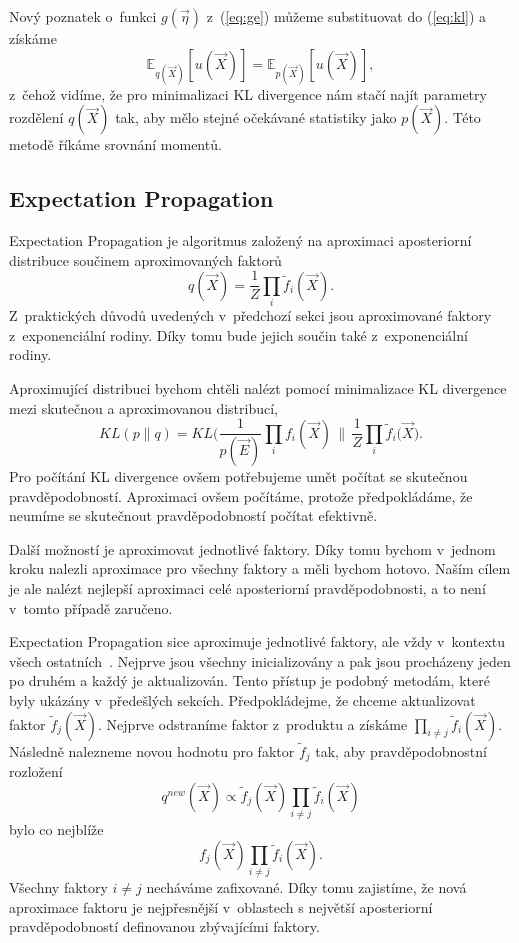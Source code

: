 Nový poznatek o~funkci $g(\vec\eta)$ z~(\ref{eq:ge}) můžeme substituovat do (\ref{eq:kl}) a získáme
\begin{equation}
\mathbb{E}_{q(\vec{X})}[u(\vec{X})] = \mathbb{E}_{p(\vec{X})}[u(\vec{X})],
\label{eq:ee}
\end{equation}
z~čehož vidíme, že pro minimalizaci KL divergence nám stačí najít parametry rozdělení $q(\vec{X})$ tak, aby mělo stejné očekávané statistiky jako $p(\vec{X})$. 
Této metodě říkáme srovnání momentů.

\subsection{Expectation Propagation}
\label{sec:ep}

Expectation Propagation je algoritmus založený na aproximaci aposteriorní distribuce součinem aproximovaných faktorů
\begin{equation}
q(\vec{X}) = \frac{1}{Z} \prod_i \tilde{f}_i(\vec{X}).
\end{equation}
Z~praktických důvodů uvedených v~předchozí sekci jsou aproximované faktory z~exponenciální rodiny.
Díky tomu bude jejich součin také z~exponenciální rodiny.

Aproximující distribuci bychom chtěli nalézt pomocí minimalizace KL divergence mezi skutečnou a aproximovanou distribucí,
\begin{equation}
KL(p \| q) = KL\bigg(\frac{1}{p(\vec{E})} \prod_i f_i(\vec{X}) \, \bigg\| \, \frac{1}{Z} \prod_i \tilde{f}_i(\vec{X} \bigg).
\end{equation}
Pro počítání KL divergence ovšem potřebujeme umět počítat se skutečnou pravděpodobností.
Aproximaci ovšem počítáme, protože předpokládáme, že neumíme se skutečnout pravděpodobností počítat efektivně.

Další možností je aproximovat jednotlivé faktory.
Díky tomu bychom v~jednom kroku nalezli aproximace pro všechny faktory a měli bychom hotovo.
Naším cílem je ale nalézt nejlepší aproximaci celé aposteriorní pravděpodobnosti, a to není v~tomto případě zaručeno.

Expectation Propagation sice aproximuje jednotlivé faktory, ale vždy v~kontextu všech ostatních~\cite{bishop2006pattern}.
Nejprve jsou všechny inicializovány a pak jsou procházeny jeden po druhém a každý je aktualizován.
Tento přístup je podobný metodám, které byly ukázány v~předešlých sekcích.
Předpokládejme, že chceme aktualizovat faktor $\tilde{f}_j (\vec{X})$.
Nejprve odstraníme faktor z~produktu a získáme $\prod_{i \ne j} \tilde{f}_i(\vec{X})$.
Následně nalezneme novou hodnotu pro faktor $\tilde{f}_j$ tak, aby pravděpodobnostní rozložení
\begin{equation}
q^{new}(\vec{X}) \propto \tilde{f}_j(\vec{X}) \prod_{i \ne j} \tilde{f}_i(\vec{X})
\label{eq:qnew}
\end{equation}
bylo co nejblíže 
\begin{equation}
f_j(\vec{X})\prod_{i \ne j} \tilde{f}_i(\vec{X}).
\end{equation}
Všechny faktory $i \ne j$ necháváme zafixované. 
Díky tomu zajistíme, že nová aproximace faktoru je nejpřesnější v~oblastech s největší aposteriorní pravděpodobností definovanou zbývajícími faktory.

